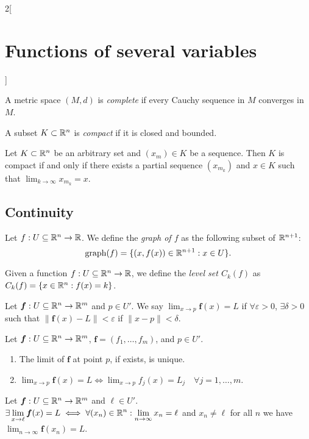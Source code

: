 \documentclass[../../../main.tex]{subfiles}
\begin{document}
\begin{multicols}{2}[\section{Functions of several variables}]
\begin{definition}
\end{definition}
\begin{definition}
A metric space $(M,d)$ is \textit{complete} if every Cauchy sequence in $M$ converges in $M$.
\label{FOSV_complete}
\end{definition}
\begin{definition}
A subset $K\subset\mathbb{R}^n$ is \textit{compact} if it is closed and bounded.
\end{definition}
\begin{theorem}
Let $K\subset\mathbb{R}^n$ be an arbitrary set and $(x_m)\in K$ be a sequence. Then $K$ is compact if and only if there exists a partial sequence $(x_{m_k})$ and $x\in K$ such that $\displaystyle\lim_{k\to\infty}x_{m_k}=x$.
\end{theorem}
\subsection{Continuity}
\begin{definition}
Let $f:U\subseteq\mathbb{R}^n\rightarrow\mathbb{R} $. We define the \textit{graph of $f$} as the following subset of $\mathbb{R}^{n+1}$: $$\text{graph}(f)=\{(x,f(x))\in\mathbb{R}^{n+1}:x\in U\}.$$
\end{definition}
\begin{definition}
Given a function $f:U\subseteq\mathbb{R}^n\rightarrow\mathbb{R} $, we define the \textit{level set $C_k(f)$} as $C_k(f)=\{x\in\mathbb{R}^n:f(x)=k\}$.
\end{definition}
\begin{definition}
Let $\boldsymbol{f}:U\subseteq\mathbb{R}^n\rightarrow\mathbb{R}^m$ and $p\in U'$. We say $\displaystyle\lim_{x\to p}\boldsymbol{f}(x)=L$ if $\forall\varepsilon>0$, $\exists\delta>0$ such that $\|\mathbf{\boldsymbol{f}}(x)-L\|<\varepsilon$ if $\|x-p\|<\delta$.
\end{definition}
\begin{prop}
Let $\mathbf{\boldsymbol{f}}:U\subseteq\mathbb{R}^n\rightarrow\mathbb{R}^m$, $\mathbf{\boldsymbol{f}}=(f_1,\ldots,f_m)$, and $p\in U'$.
\begin{enumerate}
    \item The limit of $\mathbf{\boldsymbol{f}}$ at point $p$, if exists, is unique.
    \item $\displaystyle\lim_{x\to p}\mathbf{\boldsymbol{f}}(x)=L\iff\lim_{x\to p}f_j(x)=L_j\quad\forall j=1,\ldots,m$.
\end{enumerate}
\end{prop}
\begin{lemma}
Let $\mathbf{\boldsymbol{f}}:U\subseteq\mathbb{R}^n\rightarrow\mathbb{R}^m$ and $\ell\in U'$. $\displaystyle\exists\lim_{x\to \ell}\mathbf{\boldsymbol{f}}(x)=L\iff\forall(x_n)\in\mathbb{R}^n:\lim_{n\to\infty}x_n=\ell$ and $x_n\ne \ell$ for all $n$ we have $\displaystyle\lim_{n\to \infty}\mathbf{\boldsymbol{f}}(x_n)=L$.

\end{lemma}
\end{multicols}
\end{document}
